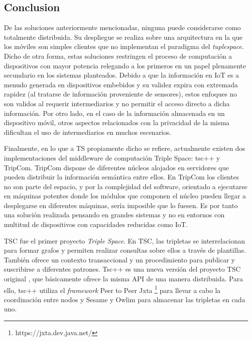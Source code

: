 \subsection{Conclusion} %



De las soluciones anteriormente mencionadas, ninguna puede considerarse como totalmente distribuida. Su despliegue se realiza sobre una arquitectura en la que los móviles son simples clientes que no implementan el paradigma del \textit{tuplespace}. Dicho de otra forma, estas soluciones restringen el proceso de computación a dispositivos con mayor potencia relegando a los primeros en un papel plenamente secundario en los sistemas planteados. Debido a que la información en IoT es a menudo generada en dispositivos embebidos y su validez expira con extremada rapidez (al tratarse de información proveniente de sensores), estos enfoques no son validos al requerir intermediarios y no permitir el acceso directo a dicha información. Por otro lado, en el caso de la información almacenada en un dispositivo móvil, otros aspectos relacionados con la privacidad de la misma dificultan el uso de intermediarios en muchos escenarios.

Finalmente, en lo que a TS propiamente dicho se refiere, actualmente existen dos implementaciones del middleware de computación Triple Space: tsc++ y TripCom. TripCom\cite{tripcom_2011} dispone de diferentes núcleos alojados en servidores que pueden distribuir la información semántica entre ellos. En TripCom los clientes no son parte del espacio, y por la complejidad del software, orientado a ejecutarse en máquinas potentes donde los módulos que componen el núcleo pueden llegar a desplegarse en diferentes máquinas, sería imposible que lo fuesen. Es por tanto una solución realizada pensando en grandes sistemas y no en entornos con multitud de dispositivos con capacidades reducidas como IoT.

TSC fue el primer proyecto \textit{Triple Space}. En TSC, las tripletas se interrelacionan para formar grafos y permiten realizar consultas sobre ellos a través de plantillas. También ofrece un contexto transaccional y un procedimiento para publicar y suscribirse a diferentes patrones. Tsc++ \cite{krummenacher_open_2009} es una nueva versión del proyecto TSC original \cite{fensel_triple-space_2004}, que básicamente ofrece la misma API de una manera distribuida. Para ello, tsc++ utiliza el \textit{framework} Peer to Peer Jxta \footnote{https://jxta.dev.java.net/} para llevar a cabo la coordinación entre nodos y Sesame \cite{broekstra_sesame:_2002} y Owlim \cite{kiryakov_owlimpragmatic_2005} para almacenar las tripletas en cada uno.

